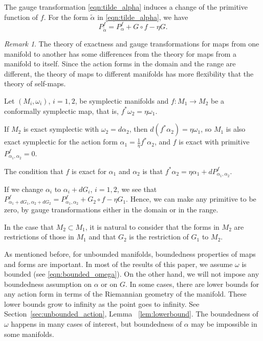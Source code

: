\documentclass[11pt]{amsart}
\theoremstyle{definition}
\theoremstyle{remark}
\newtheorem{rem}[thm]{Remark}
\numberwithin{equation}{section}
\begin{document}
The  gauge transformation \eqref{eqn:tilde_alpha}
induces a change of the primitive function of $f$.
For the form $\tilde \alpha$ in \eqref{eqn:tilde_alpha}, we have
\begin{equation}\label{eqn:Pf_gauge}
P^{f}_{\tilde \alpha} = P^{f}_{\alpha} + G\circ f - \eta G.
\end{equation}

%

\begin{rem}
The theory of exactness and gauge transformations
for maps from one manifold to another has some differences
from the theory  for maps from a manifold to itself.
Since the  action forms in the domain and the range are different,
the theory of maps to different manifolds has more flexibility that
the theory of self-maps.

Let $(M_i,\omega_i)$, $i=1,2$, be symplectic manifolds and $f:M_1\to M_2$   be a conformally symplectic map, that is,
$f^*\omega_2 = \eta \omega_1$.

If $M_2$ is exact symplectic with $\omega_2=d\alpha_2$, then $d(f^*\alpha_2)=\eta\omega_1$, so $M_1$ is also exact symplectic for the action form $\alpha_1=\frac{1}{\eta}f^*\alpha_2$,  and $f$ is exact  with primitive $P_{\alpha_1,\alpha_2}^f=0$.


The condition that $f$ is exact for $\alpha_1$ and $\alpha_2$ is that $f^*\alpha_2=\eta\alpha_1+dP^f_{\alpha_1,\alpha_2}$.

If we change $\alpha_i$ to $\alpha_i + dG_i$, $i = 1,2$, we see that
 $P^{f}_{\alpha_1+dG_1,\alpha_2+dG_2} = P^{f}_{\alpha_1,\alpha_2} + G_2\circ f - \eta G_1$.
Hence, we can make any primitive to be zero, by gauge
transformations either  in the domain  or in  the range.

In the case that $M_2 \subset M_1$, it is natural to
consider that the forms in $M_2$ are restrictions of those in $M_1$
and that $G_2$ is the restriction of $G_1$ to $M_2$.
\end{rem}



As mentioned before, for  unbounded
manifolds, boundedness properties of maps and forms are important.
In most of the results of this paper, we assume  $\omega$ is bounded (see \eqref{eqn:bounded_omega}).
On the other hand,
we will not impose any boundedness assumption on $\alpha$ or on $G$.
In some  cases,  there are lower bounds for any action form in
terms of the Riemannian geometry of the manifold.
These lower bounds grow to infinity as the point goes to infinity.
See Section~\ref{sec:unbounded_action}, Lemma ~\ref{lem:lowerbound}.
The boundedness of $\omega$ happens in many cases of interest, but
boundedness of $\alpha$ may be impossible in some manifolds.
\end{document}
